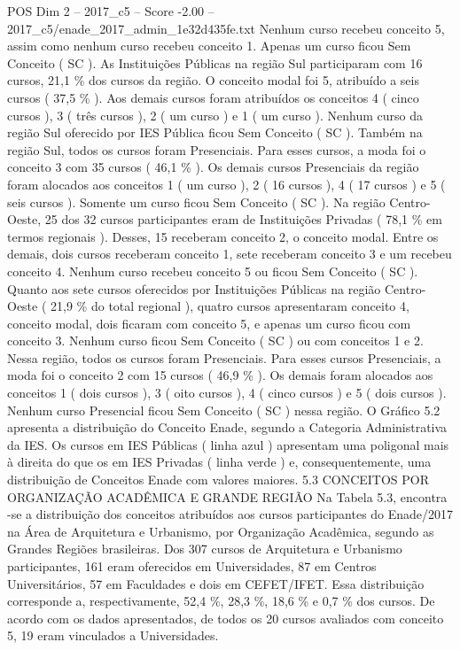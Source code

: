 \begin{textsample}{POS Dim 2 – 2017\_c5 – Score -2.00 – 2017\_c5/enade\_2017\_admin\_1e32d435fe.txt}
Nenhum curso recebeu conceito 5, assim como nenhum curso recebeu conceito 1.
Apenas um curso ficou Sem Conceito ( SC ).
As Instituições Públicas na região Sul participaram com 16 cursos, 21,1 \% dos cursos da região.
O conceito modal foi 5, atribuído a seis cursos ( 37,5 \% ).
Aos demais cursos foram atribuídos os conceitos 4 ( cinco cursos ), 3 ( três cursos ), 2 ( um curso ) e 1 ( um curso ).
Nenhum curso da região Sul oferecido por IES Pública ficou Sem Conceito ( SC ).
Também na região Sul, todos os cursos foram Presenciais.
Para esses cursos, a moda foi o conceito 3 com 35 cursos ( 46,1 \% ).
Os demais cursos Presenciais da região foram alocados aos conceitos 1 ( um curso ), 2 ( 16 cursos ), 4 ( 17 cursos ) e 5 ( seis cursos ).
Somente um curso ficou Sem Conceito ( SC ).
Na região Centro-Oeste, 25 dos 32 cursos participantes eram de Instituições Privadas ( 78,1 \% em termos regionais ).
Desses, 15 receberam conceito 2, o conceito modal.
Entre os demais, dois cursos receberam conceito 1, sete receberam conceito 3 e um recebeu conceito 4.
Nenhum curso recebeu conceito 5 ou ficou Sem Conceito ( SC ).
Quanto aos sete cursos oferecidos por Instituições Públicas na região Centro-Oeste ( 21,9 \% do total regional ), quatro cursos apresentaram conceito 4, conceito modal, dois ficaram com conceito 5, e apenas um curso ficou com conceito 3.
Nenhum curso ficou Sem Conceito ( SC ) ou com conceitos 1 e 2.
Nessa região, todos os cursos foram Presenciais.
Para esses cursos Presenciais, a moda foi o conceito 2 com 15 cursos ( 46,9 \% ).
Os demais foram alocados aos conceitos 1 ( dois cursos ), 3 ( oito cursos ), 4 ( cinco cursos ) e 5 ( dois cursos ).
Nenhum curso Presencial ficou Sem Conceito ( SC ) nessa região.
O Gráfico 5.2 apresenta a distribuição do Conceito Enade, segundo a Categoria Administrativa da IES.
Os cursos em IES Públicas ( linha azul ) apresentam uma poligonal mais à direita do que os em IES Privadas ( linha verde ) e, consequentemente, uma distribuição de Conceitos Enade com valores maiores. 5.3 CONCEITOS POR ORGANIZAÇÃO ACADÊMICA E GRANDE REGIÃO Na Tabela 5.3, encontra -se a distribuição dos conceitos atribuídos aos cursos participantes do Enade/2017 na Área de Arquitetura e Urbanismo, por Organização Acadêmica, segundo as Grandes Regiões brasileiras.
Dos 307 cursos de Arquitetura e Urbanismo participantes, 161 eram oferecidos em Universidades, 87 em Centros Universitários, 57 em Faculdades e dois em CEFET/IFET.
Essa distribuição corresponde a, respectivamente, 52,4 \%, 28,3 \%, 18,6 \% e 0,7 \% dos cursos.
De acordo com os dados apresentados, de todos os 20 cursos avaliados com conceito 5, 19 eram vinculados a Universidades.

\end{textsample}
